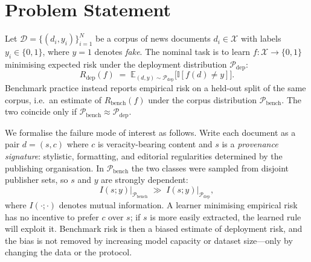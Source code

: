 \documentclass[conference]{IEEEtran}
\begin{document}
\section{Problem Statement}
\label{sec:problem}

Let $\mathcal{D}=\{(d_i,y_i)\}_{i=1}^{N}$ be a corpus of news documents
$d_i \in \mathcal{X}$ with labels $y_i \in \{0,1\}$, where $y=1$ denotes
\emph{fake}. The nominal task is to learn $f:\mathcal{X}\rightarrow\{0,1\}$
minimising expected risk under the deployment distribution $\mathcal{P}_{\text{dep}}$:
\begin{equation}
  R_{\text{dep}}(f) \;=\; \mathbb{E}_{(d,y)\sim\mathcal{P}_{\text{dep}}}
  \big[\mathbb{I}[f(d)\neq y]\big].
  \label{eq:risk}
\end{equation}
Benchmark practice instead reports empirical risk on a held-out split of the
same corpus, i.e.\ an estimate of $R_{\text{bench}}(f)$ under the corpus
distribution $\mathcal{P}_{\text{bench}}$. The two coincide only if
$\mathcal{P}_{\text{bench}}\approx\mathcal{P}_{\text{dep}}$.

We formalise the failure mode of interest as follows. Write each document as a
pair $d=(s,c)$ where $c$ is veracity-bearing content and $s$ is a
\emph{provenance signature}: stylistic, formatting, and editorial regularities
determined by the publishing organisation. In $\mathcal{P}_{\text{bench}}$ the
two classes were sampled from disjoint publisher sets, so $s$ and $y$ are
strongly dependent:
\begin{equation}
  I(s;y)\Big|_{\mathcal{P}_{\text{bench}}} \;\gg\;
  I(s;y)\Big|_{\mathcal{P}_{\text{dep}}},
  \label{eq:mi}
\end{equation}
where $I(\cdot;\cdot)$ denotes mutual information. A learner minimising
empirical risk has no incentive to prefer $c$ over $s$; if $s$ is more easily
extracted, the learned rule will exploit it. Benchmark risk is then a biased
estimate of deployment risk, and the bias is not removed by increasing model
capacity or dataset size---only by changing the data or the protocol.
\end{document}
